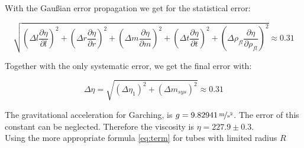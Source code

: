 With the Gaußian error propagation we get for the statistical error:

\begin{equation}
\sqrt{
\left(\Delta l\frac{\partial \eta}{\partial l}\right)^2
+
\left(\Delta r\frac{\partial \eta}{\partial r}\right)^2
+
\left(\Delta m\frac{\partial \eta}{\partial m}\right)^2
+
\left(\Delta t\frac{\partial \eta}{\partial t}\right)^2
+
\left(\Delta \rho_{fl}\frac{\partial \eta}{\partial \rho_{fl}}\right)^2
} \approx 0.31
\end{equation}

Together with the only systematic error, we get the final error with:

\begin{equation}
\Delta \eta = \sqrt{\left(\Delta \eta_1\right)^2 + \left(\Delta m_{sys}\right)^2} \approx 0.31
\end{equation}

The gravitational acceleration for Garching, is $g = \unitfrac[9.82941]{m}{s^2}$. The error of this constant can be neglected. Therefore the viscosity is $\eta = 227.9 \pm 0.3$.\\
Using the more appropriate formula \ref{eq:term} for tubes with limited radius $R$






